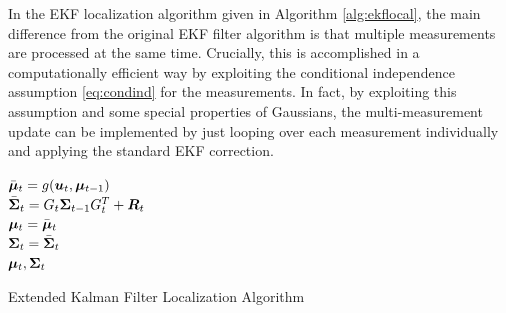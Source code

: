 In the EKF localization algorithm given in Algorithm \ref{alg:ekflocal}, the main difference from the original EKF filter algorithm is that multiple measurements are processed at the same time. Crucially, this is accomplished in a computationally efficient way by exploiting the conditional independence assumption \eqref{eq:condind} for the measurements. In fact, by exploiting this assumption and some special properties of Gaussians, the multi-measurement update can be implemented by just looping over each measurement individually and applying the standard EKF correction.
\begin{algorithm}[ht]
 $\bar{\bm{\mu}}_t = g(\bm{u}_t,\bm{\mu}_{t-1})$\\
 $\bar{\bm{\Sigma}}_t = G_t\bm{\Sigma}_{t-1} G_t^{T} + \bm{R}_t$\\
 $\bm{\mu}_t = \bar{\bm{\mu}}_t$\\
 $\bm{\Sigma}_t = \bar{\bm{\Sigma}}_t$\\
 \Return $\bm{\mu}_t, \bm{\Sigma}_t$
 \caption{Extended Kalman Filter Localization Algorithm}
 \label{alg:ekflocal}
\end{algorithm}

